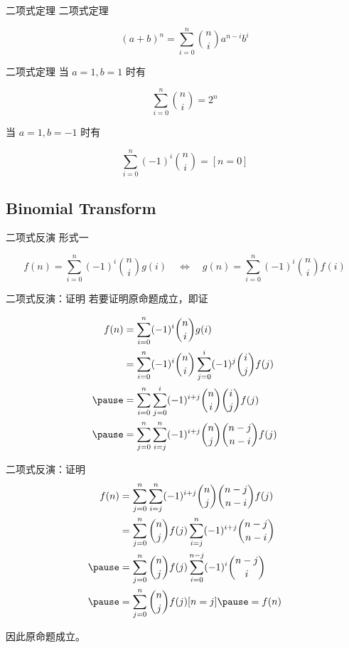 \documentclass[12pt,aspectratio=169]{beamer}
\begin{document}
\begin{frame}[fragile]{二项式定理}
二项式定理

$$
(a+b)^n = \sum_{i=0}^{n} {n \choose i} a^{n-i} b^{i}
$$
\end{frame}

\begin{frame}[fragile]{二项式定理}
当 $a=1, b=1$ 时有

$$
\sum_{i=0}^{n} {n \choose i} = 2^n
$$

当 $a=1, b=-1$ 时有

$$
\sum_{i=0}^{n} (-1)^i {n \choose i} = [n = 0]
$$
\end{frame}

\subsection[二项式反演]{Binomial Transform}

\begin{frame}[fragile]{二项式反演}
形式一

$$
f(n) = \sum_{i=0}^{n} (-1)^i {n \choose i} g(i)
\quad \Longleftrightarrow \quad
g(n) = \sum_{i=0}^{n} (-1)^i {n \choose i} f(i)
$$
\end{frame}

\begin{frame}[fragile]{二项式反演：证明}
若要证明原命题成立，即证

$$
\begin{aligned}
  f(n) &= \sum_{i=0}^{n} (-1)^i {n \choose i} g(i) \\
       &= \sum_{i=0}^{n} (-1)^i {n \choose i} \sum_{j=0}^{i} (-1)^j {i \choose j} f(j) \\ \pause
       &= \sum_{i=0}^{n} \sum_{j=0}^{i} (-1)^{i+j} {n \choose i} {i \choose j} f(j) \\ \pause
       &= \sum_{j=0}^{n} \sum_{i=j}^{n} (-1)^{i+j} {n \choose j} {n - j \choose n - i} f(j)
\end{aligned}
$$
\end{frame}

\begin{frame}[fragile]{二项式反演：证明}
$$
\begin{aligned}
  f(n) &= \sum_{j=0}^{n} \sum_{i=j}^{n} (-1)^{i+j} {n \choose j} {n - j \choose n - i} f(j) \\
       &= \sum_{j=0}^{n} {n \choose j} f(j) \sum_{i=j}^{n} (-1)^{i+j} {n - j \choose n - i} \\ \pause
       &= \sum_{j=0}^{n} {n \choose j} f(j) \sum_{i=0}^{n-j} (-1)^{i} {n - j \choose i} \\ \pause
       &= \sum_{j=0}^{n} {n \choose j} f(j) [n = j] \pause = f(n)
\end{aligned}
$$

因此原命题成立。
\end{frame}
\end{document}
